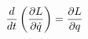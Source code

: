 \documentclass[preview]{standalone}
\begin{document}
\begin{align*}
\special{dvisvgm:raw <g id='unique000'>}\frac{d}{dt}\left(\frac{\partial L}{\partial \dot{q}}\right) = \frac{\partial L}{\partial q}\special{dvisvgm:raw </g>}
\end{align*}
\end{document}
